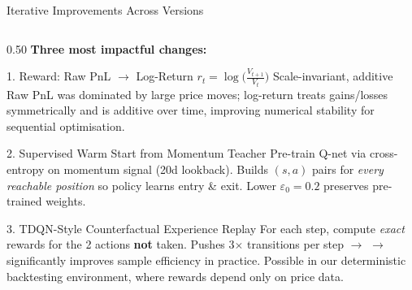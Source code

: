 \documentclass[aspectratio=169, 10pt]{beamer}
\begin{document}
\begin{frame}[shrink=5]{Iterative Improvements Across Versions}
\begin{columns}[T]
\begin{column}{0.50\textwidth}
\vspace{-0.3em}
{\scriptsize \textbf{Three most impactful changes:}}

\vspace{0.3em}
\begin{block}{\tiny 1. Reward: Raw PnL $\to$ Log-Return}
\vspace{-0.4em}
{\tiny
$r_t = \log\!\bigl(\tfrac{V_{t+1}}{V_t}\bigr)$ \hfill \textcolor{good}{Scale-invariant, additive}\\[1pt]
Raw PnL was dominated by large price moves; log-return treats gains/losses symmetrically and is additive over time, improving numerical stability for sequential optimisation.
}
\vspace{-0.2em}
\end{block}

\vspace{0.15em}
\begin{block}{\tiny 2. Supervised Warm Start from Momentum Teacher}
\vspace{-0.4em}
{\tiny
Pre-train Q-net via cross-entropy on momentum signal (20d lookback). Builds $(s, a)$ pairs
for \emph{every reachable position} so policy learns entry \& exit. Lower $\varepsilon_0{=}0.2$ preserves pre-trained weights.
}
\vspace{-0.2em}
\end{block}

\vspace{0.15em}
\begin{block}{\tiny 3. TDQN-Style Counterfactual Experience Replay}
\vspace{-0.4em}
{\tiny
For each step, compute \emph{exact} rewards for the 2 actions \textbf{not} taken. Pushes 3$\times$
transitions per step $\to$ $\to$ significantly improves sample efficiency in practice. Possible in our deterministic backtesting environment, where rewards depend only on price data.
}
\vspace{-0.2em}
\end{block}
\end{column}
\end{columns}
\end{frame}
\end{document}
